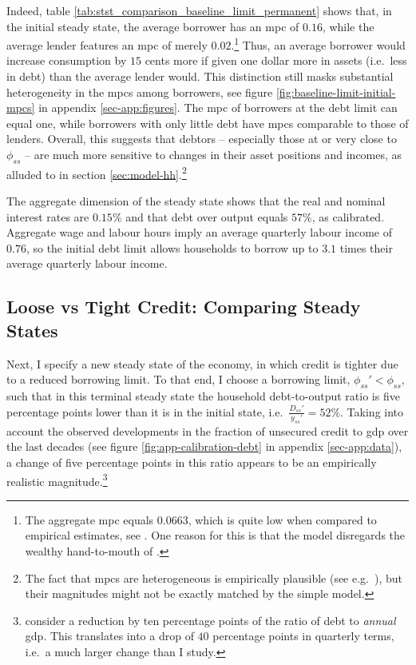 \documentclass[12pt]{article} %
\numberwithin{equation}{section} %
\numberwithin{figure}{section}
\numberwithin{table}{section}
\begin{document}
Indeed, table \ref{tab:stst_comparison_baseline_limit_permanent} shows that, in the initial steady state, the average borrower has an \Gls{mpc} of $0.16$, while the average lender features an \Gls{mpc} of merely $0.02$.\footnote{The aggregate \Gls{mpc} equals $0.0663$, which is quite low when compared to empirical estimates, see \textcite{kaplan2018}. One reason for this is that the model disregards the wealthy hand-to-mouth of \textcite{kaplan2014}.} Thus, an average borrower would increase consumption by $15$ cents more if given one dollar more in assets (i.e.~less in debt) than the average lender would. This distinction still masks substantial heterogeneity in the \Gls{mpc}s among borrowers, see figure \ref{fig:baseline-limit-initial-mpcs} in appendix \ref{sec-app:figures}. The \Gls{mpc} of borrowers at the debt limit can equal one, while borrowers with only little debt have \Gls{mpc}s comparable to those of lenders. Overall, this suggests that debtors -- especially those at or very close to $\phi_{ss}$ -- are much more sensitive to changes in their asset positions and incomes, as alluded to in section \ref{sec:model-hh}.\footnote{The fact that \Gls{mpc}s are heterogeneous is empirically plausible (see e.g.~\cite{gross2002}), but their magnitudes might not be exactly matched by the simple model.} %

The aggregate dimension of the steady state shows that the real and nominal interest rates are $0.15\%$ and that debt over output equals $57\%$, as calibrated. Aggregate wage and labour hours imply an average quarterly labour income of $0.76$, so the initial debt limit allows households to borrow up to $3.1$ times their average quarterly labour income. 

\subsection{Loose vs Tight Credit: Comparing Steady States}
\label{sec:limit-stst-tight}

Next, I specify a new steady state of the economy, in which credit is tighter due to a reduced borrowing limit. To that end, I choose a borrowing limit, $\phi_{ss}' < \phi_{ss}$, such that in this terminal steady state the household debt-to-output ratio is five percentage points lower than it is in the initial state, i.e.~$\frac{D_{ss}'}{y_{ss}'} = 52\%$. Taking into account the observed developments in the fraction of unsecured credit to \Gls{gdp} over the last decades (see figure \ref{fig:app-calibration-debt} in appendix \ref{sec-app:data}), a change of five percentage points in this ratio appears to be an empirically realistic magnitude.\footnote{\textcite{gl2017} consider a reduction by ten percentage points of the ratio of debt to \textit{annual} \Gls{gdp}. This translates into a drop of $40$ percentage points in quarterly terms, i.e.~a much larger change than I study.} 
\end{document}
